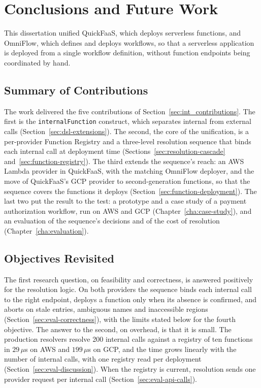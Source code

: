 %
%
%
\chapter{Conclusions and Future Work}
\label{cha:conclusions}

This dissertation unified QuickFaaS, which deploys serverless functions, and OmniFlow, which
defines and deploys workflows, so that a serverless application is deployed from a single workflow
definition, without function endpoints being coordinated by hand.

\section{Summary of Contributions}
\label{sec:concl-contributions}

The work delivered the five contributions of Section~\ref{sec:int_contributions}. The first is the
\texttt{internalFunction} construct, which separates internal from external calls
(Section~\ref{sec:dsl-extensions}). The second, the core of the unification, is a per-provider
Function Registry and a three-level resolution sequence that binds each internal call at deployment
time (Sections~\ref{sec:resolution-cascade} and~\ref{sec:function-registry}). The third extends the
sequence's reach: an AWS Lambda provider in QuickFaaS, with the matching OmniFlow deployer, and the
move of QuickFaaS's GCP provider to second-generation functions, so that the sequence covers the
functions it deploys (Section~\ref{sec:function-deployment}). The last two put the result to the
test: a prototype and a case study of a payment authorization workflow, run on AWS and GCP
(Chapter~\ref{cha:case-study}), and an evaluation of the sequence's decisions and of the cost of
resolution (Chapter~\ref{cha:evaluation}).

\section{Objectives Revisited}
\label{sec:concl-objectives}

The first research question, on feasibility and correctness, is answered positively for the
resolution logic. On both providers the sequence binds each internal call to the right endpoint,
deploys a function only when its absence is confirmed, and aborts on stale entries, ambiguous names
and inaccessible regions (Section~\ref{sec:eval-correctness}), with the limits stated below for the
fourth objective. The answer to the second, on overhead, is that it is small. The production
resolvers resolve 200 internal calls against a registry of ten functions in $29\,\mu$s on AWS and
$199\,\mu$s on GCP, and the time grows linearly with the number of internal calls, with one registry
read per deployment (Section~\ref{sec:eval-discussion}). When the registry is current, resolution
sends one provider request per internal call (Section~\ref{sec:eval-api-calls}).

